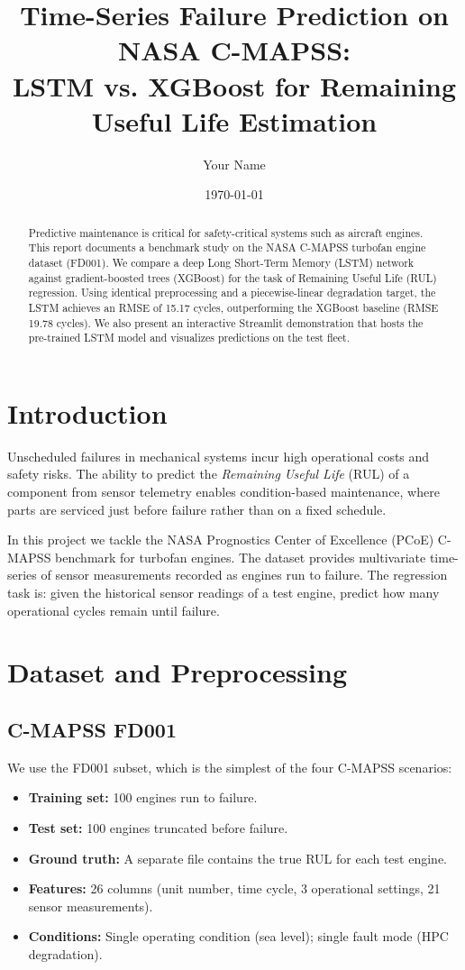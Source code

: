 \documentclass[11pt,a4paper]{article}
\title{\textbf{Time-Series Failure Prediction on NASA C-MAPSS:\\LSTM vs. XGBoost for Remaining Useful Life Estimation}}
\author{Your Name}
\date{\today}
\begin{document}
\maketitle

\begin{abstract}
Predictive maintenance is critical for safety-critical systems such as aircraft engines. This report documents a benchmark study on the NASA C-MAPSS turbofan engine dataset (FD001). We compare a deep Long Short-Term Memory (LSTM) network against gradient-boosted trees (XGBoost) for the task of Remaining Useful Life (RUL) regression. Using identical preprocessing and a piecewise-linear degradation target, the LSTM achieves an RMSE of 15.17 cycles, outperforming the XGBoost baseline (RMSE 19.78 cycles). We also present an interactive Streamlit demonstration that hosts the pre-trained LSTM model and visualizes predictions on the test fleet.
\end{abstract}

\section{Introduction}
Unscheduled failures in mechanical systems incur high operational costs and safety risks. The ability to predict the \emph{Remaining Useful Life} (RUL) of a component from sensor telemetry enables condition-based maintenance, where parts are serviced just before failure rather than on a fixed schedule.

In this project we tackle the NASA Prognostics Center of Excellence (PCoE) C-MAPSS benchmark for turbofan engines. The dataset provides multivariate time-series of sensor measurements recorded as engines run to failure. The regression task is: given the historical sensor readings of a test engine, predict how many operational cycles remain until failure.

\section{Dataset and Preprocessing}
\subsection{C-MAPSS FD001}
We use the FD001 subset, which is the simplest of the four C-MAPSS scenarios:
\begin{itemize}
    \item \textbf{Training set:} 100 engines run to failure.
    \item \textbf{Test set:} 100 engines truncated before failure.
    \item \textbf{Ground truth:} A separate file contains the true RUL for each test engine.
    \item \textbf{Features:} 26 columns (unit number, time cycle, 3 operational settings, 21 sensor measurements).
    \item \textbf{Conditions:} Single operating condition (sea level); single fault mode (HPC degradation).
\end{itemize}
\end{document}
